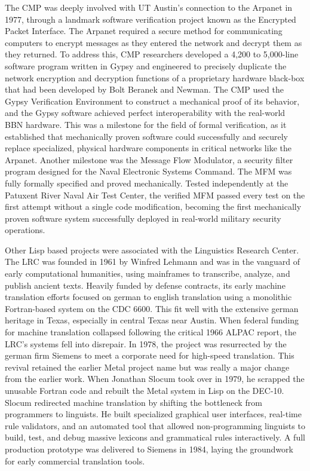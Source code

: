 The CMP was deeply involved with UT Austin’s connection to the Arpanet in 1977, through a landmark software verification project known as the Encrypted Packet Interface. The Arpanet required a secure method for communicating computers to encrypt messages as they entered the network and decrypt them as they returned. To address this, CMP researchers developed a 4,200 to 5,000-line software program written in Gypsy and engineered to precisely duplicate the network encryption and decryption functions of a proprietary hardware black-box that had been developed by Bolt Beranek and Newman. The CMP used the Gypsy Verification Environment to construct a mechanical proof of its behavior, and the Gypsy software achieved perfect interoperability with the real-world BBN hardware. This was a milestone for the field of formal verification, as it established that mechanically proven software could successfully and securely replace specialized, physical hardware components in critical networks like the Arpanet. Another milestone was the Message Flow Modulator, a security filter program designed for the Naval Electronic Systems Command. The MFM was fully formally specified and proved mechanically. Tested independently at the Patuxent River Naval Air Test Center, the verified MFM passed every test on the first attempt without a single code modification, becoming the first mechanically proven software system successfully deployed in real-world military security operations.

Other Lisp based projects were associated with the Linguistics Research Center. The LRC was founded in 1961 by Winfred Lehmann and was in the vanguard of early computational humanities, using mainframes to transcribe, analyze, and publish ancient texts. Heavily funded by defense contracts, its early machine translation efforts focused on german to english translation using a monolithic Fortran-based system on the CDC 6600. This fit well with the extensive german heritage in Texas, especially in central Texas near Austin. When federal funding for machine translation collapsed following the critical 1966 ALPAC report, the LRC's systems fell into disrepair. In 1978, the project was resurrected by the german firm Siemens to meet a corporate need for high-speed translation. This revival retained the earlier Metal project name but was really a major change from the earlier work. When Jonathan Slocum took over in 1979, he scrapped the unusable Fortran code and rebuilt the Metal system in Lisp on the DEC-10. Slocum redirected machine translation by shifting the bottleneck from programmers to linguists. He built specialized graphical user interfaces, real-time rule validators, and an automated tool that allowed non-programming linguists to build, test, and debug massive lexicons and grammatical rules interactively. A full production prototype was delivered to Siemens in 1984, laying the groundwork for early commercial translation tools.

